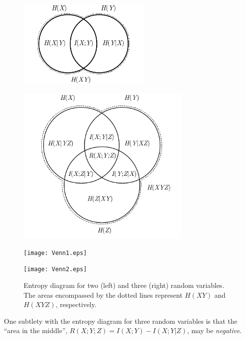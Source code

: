 \begin{figure}[H]
\ifpdf
\begin{minipage}[b]{6cm}
\includegraphics[width=6.5cm]{Venn1.pdf} \\[4ex]
\end{minipage}
\begin{minipage}[b]{6cm}
\includegraphics[width=8.5cm]{Venn2.pdf}
\end{minipage}
\else
\begin{minipage}[b]{6cm}
\texttt{[image: Venn1.eps]} \\[4ex]
\end{minipage}
\begin{minipage}[b]{6cm}
\texttt{[image: Venn2.eps]}
\end{minipage}
\fi
\vspace{-2ex}
\caption{Entropy diagram for two (left) and three (right) random variables. The areas encompassed by the dotted lines represent $H(XY)$ and $H(XYZ)$, respectively.}\label{fig:entropy-diagram}
\end{figure}

One subtlety with the entropy diagram for three random variables is that the ``area in the middle'', $R(X;Y;Z) = I(X;Y) - I(X;Y|Z)$, may be {\em negative}.



